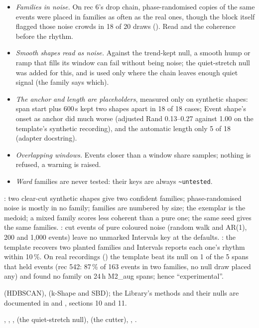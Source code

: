 \begin{itemize}
\item \emph{Families in noise.} On rec 6's drop chain, phase-randomised copies of the same
  events were placed in families as often as the real ones, though the block itself flagged
  those noise crowds in 18 of 20 draws ().
  Read  and the coherence before the rhythm.
\item \emph{Smooth shapes read as noise.} Against the trend-kept null, a smooth hump or ramp
  that fills its window can fail without being noise; the quiet-stretch null was added for
  this, and is used only where the chain leaves enough quiet signal (the family says which).
\item \emph{The anchor and length are placeholders}, measured only on synthetic shapes:
  span start plus 600\,s kept two shapes apart in 18 of 18 cases; Event shape's onset as
  anchor did much worse (adjusted Rand 0.13--0.27 against 1.00 on the template's synthetic
  recording), and the automatic length only 5 of 18 (adapter docstring).
\item \emph{Overlapping windows.} Events closer than a window share samples; nothing is
  refused, a warning is raised.
\item \emph{Ward} families are never tested: their keys are always
  \texttt{\textasciitilde untested}.
\end{itemize}

: two clear-cut synthetic shapes give two confident
families; phase-randomised noise is mostly in no family; families are numbered by size; the
exemplar is the medoid; a mixed family scores less coherent than a pure one; the same seed
gives the same families. : cut events of pure
coloured noise (random walk and AR(1), 200 and 1{,}000 events) leave no unmarked Intervals
key at the defaults. : the template recovers two
planted families and Intervals reports each one's rhythm within 10\,\%. On real recordings
() the template beat its null on 1 of the 5 spans that held events
(rec 542: 87\,\% of 163 events in two families, no null draw placed any) and found no family
on 24\,h M2\_aug spans; hence ``experimental''.

\citet{campello2013density} (HDBSCAN), \citet{paparrizos2015kshape} (k-Shape and SBD); the
Library's methods and their nulls are documented in
 and
, sections 10 and 11.

, ,
, 
(the quiet-stretch null),  (the cutter),
, .
